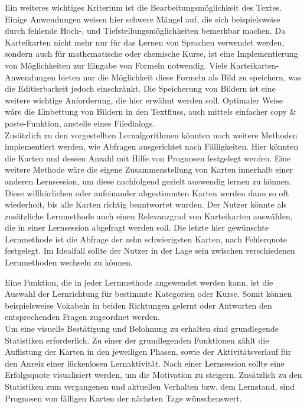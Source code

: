 Ein weiteres wichtiges Kriterium ist die Bearbeitungsmöglichkeit des Textes. Einige Anwendungen weisen hier schwere Mängel auf, die sich beispielsweise durch fehlende Hoch-, und Tiefstellungsmöglichkeiten bemerkbar machen. Da Karteikarten nicht mehr nur für das Lernen von Sprachen verwendet werden, sondern auch für mathematische oder chemische Kurse, ist eine Implementierung von Möglichkeiten zur Eingabe von Formeln notwendig. Viele Karteikarten-Anwendungen bieten nur die Möglichkeit diese Formeln als Bild zu speichern, was die Editierbarkeit jedoch einschränkt. Die Speicherung von Bildern ist eine weitere wichtige Anforderung, die hier erwähnt werden soll. Optimaler Weise wäre die Einbettung von Bildern in den Textfluss, auch mittels einfacher copy {\&} paste-Funktion, anstelle eines Filedialogs. \\

Zusätzlich zu den vorgestellten Lernalgorithmen könnten noch weitere Methoden implementiert werden, wie Abfragen ausgerichtet nach Fälligkeiten. Hier könnten die Karten und dessen Anzahl mit Hilfe von Prognosen festgelegt werden. Eine weitere Methode wäre die eigene Zusammenstellung von Karten innerhalb einer anderen Lernsession, um diese nachfolgend gezielt auswendig lernen zu können. Diese willkürlichen oder aufeinander abgestimmten Karten werden dann so oft wiederholt, bis alle Karten richtig beantwortet wurden. Der Nutzer könnte als zusätzliche Lernmethode auch einen Relevanzgrad von Karteikarten auswählen, die in einer Lernsession abgefragt werden soll. Die letzte hier gewünschte Lernmethode ist die Abfrage der zehn schwierigsten Karten, nach Fehlerquote festgelegt. Im Idealfall sollte der Nutzer in der Lage sein zwischen verschiedenen Lernmethoden wechseln zu können. 

Eine Funktion, die in jeder Lernmethode angewendet werden kann, ist die Auswahl der Lernrichtung für bestimmte Kategorien oder Kurse. Somit können beispielsweise Vokabeln in beiden Richtungen gelernt oder Antworten den entsprechenden Fragen zugeordnet werden. \\

Um eine visuelle Bestätigung und Belohnung zu erhalten sind grundlegende Statistiken erforderlich. Zu einer der grundlegenden Funktionen zählt die Auflistung der Karten in den jeweiligen Phasen, sowie der Aktivitätsverlauf für den Anreiz einer lückenlosen Lernaktivität. Nach einer Lernsession sollte eine Erfolgsquote visualisiert werden, um die Motivation zu steigern. Zusätzlich zu den Statistiken zum vergangenen und aktuellen Verhalten bzw. dem Lernstand, sind Prognosen von fälligen Karten der nächsten Tage wünschenswert. \\

